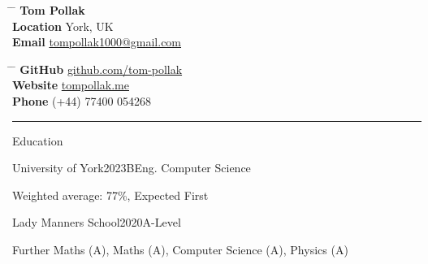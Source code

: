 \documentclass{structure} %
\begin{document}

\parbox{0.5\textwidth}{ %
\begin{tabbing} %
\hspace{2cm} \= \hspace{4cm} \= \kill %
{\namesize\bf{Tom Pollak}} \\[6pt]
{\bf Location} \> York, UK\\ %
{\bf Email} \> \href{mailto:tompollak1000@gmail.com}{tompollak1000@gmail.com}  %
\end{tabbing}}
\hfill %
\parbox{0.5\textwidth}{ %
\vspace*{10pt}
\begin{tabbing} %
\hspace{2cm} \= \hspace{4cm} \= \kill %
{\bf GitHub} \> \href{https://github.com/tom-pollak}{github.com/tom-pollak} \\ %
{\bf Website} \> \href{https://tompollak.me}{tompollak.me} \\  %
{\bf Phone} \> (+44) 77400 054268 %
\end{tabbing}}

\smallskip
\hrule %
\smallskip

\begin{rSection}{Education}

\begin{rSubsection}{University of York}{2023}{BEng. Computer Science}{}{}
    \item Weighted average: 77\%, Expected First
\end{rSubsection}

\begin{rSubsection}{Lady Manners School}{2020}{A-Level}{}{}
    \item Further Maths (A), Maths (A), Computer Science (A), Physics (A)
\end{rSubsection}
\end{rSection}
\end{document}
